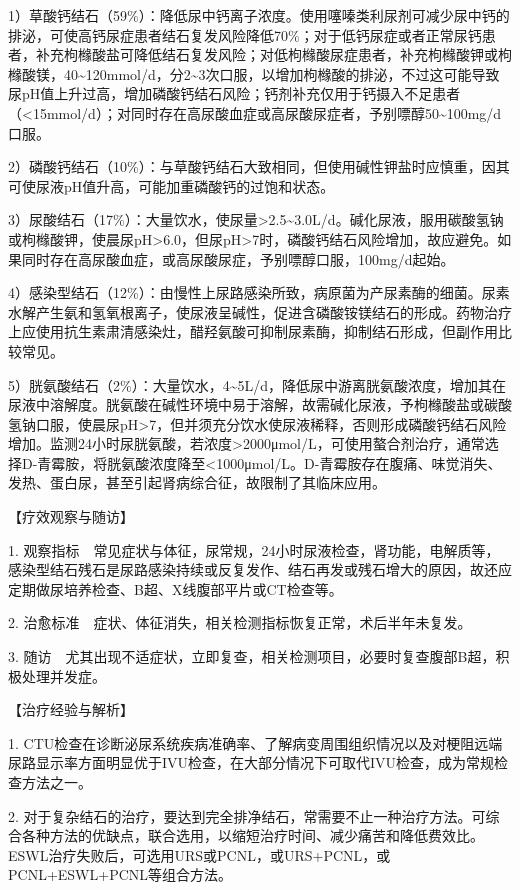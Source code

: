 1）草酸钙结石（59\%）：降低尿中钙离子浓度。使用噻嗪类利尿剂可减少尿中钙的排泌，可使高钙尿症患者结石复发风险降低70\%；对于低钙尿症或者正常尿钙患者，补充枸橼酸盐可降低结石复发风险；对低枸橼酸尿症患者，补充枸橼酸钾或枸橼酸镁，40\textasciitilde{}120mmol/d，分2\textasciitilde{}3次口服，以增加枸橼酸的排泌，不过这可能导致尿pH值上升过高，增加磷酸钙结石风险；钙剂补充仅用于钙摄入不足患者（\textless{}15mmol/d）；对同时存在高尿酸血症或高尿酸尿症者，予别嘌醇50\textasciitilde{}100mg/d口服。

2）磷酸钙结石（10\%）：与草酸钙结石大致相同，但使用碱性钾盐时应慎重，因其可使尿液pH值升高，可能加重磷酸钙的过饱和状态。

3）尿酸结石（17\%）：大量饮水，使尿量\textgreater{}2.5\textasciitilde{}3.0L/d。碱化尿液，服用碳酸氢钠或枸橼酸钾，使晨尿pH\textgreater{}6.0，但尿pH\textgreater{}7时，磷酸钙结石风险增加，故应避免。如果同时存在高尿酸血症，或高尿酸尿症，予别嘌醇口服，100mg/d起始。

4）感染型结石（12\%）：由慢性上尿路感染所致，病原菌为产尿素酶的细菌。尿素水解产生氨和氢氧根离子，使尿液呈碱性，促进含磷酸铵镁结石的形成。药物治疗上应使用抗生素肃清感染灶，醋羟氨酸可抑制尿素酶，抑制结石形成，但副作用比较常见。

5）胱氨酸结石（2\%）：大量饮水，4\textasciitilde{}5L/d，降低尿中游离胱氨酸浓度，增加其在尿液中溶解度。胱氨酸在碱性环境中易于溶解，故需碱化尿液，予枸橼酸盐或碳酸氢钠口服，使晨尿pH\textgreater{}7，但并须充分饮水使尿液稀释，否则形成磷酸钙结石风险增加。监测24小时尿胱氨酸，若浓度\textgreater{}2000μmol/L，可使用螯合剂治疗，通常选择D-青霉胺，将胱氨酸浓度降至\textless{}1000μmol/L。D-青霉胺存在腹痛、味觉消失、发热、蛋白尿，甚至引起肾病综合征，故限制了其临床应用。

【疗效观察与随访】

1.
观察指标　常见症状与体征，尿常规，24小时尿液检查，肾功能，电解质等，感染型结石残石是尿路感染持续或反复发作、结石再发或残石增大的原因，故还应定期做尿培养检查、B超、X线腹部平片或CT检查等。

2. 治愈标准　症状、体征消失，相关检测指标恢复正常，术后半年未复发。

3.
随访　尤其出现不适症状，立即复查，相关检测项目，必要时复查腹部B超，积极处理并发症。

【治疗经验与解析】

1.
CTU检查在诊断泌尿系统疾病准确率、了解病变周围组织情况以及对梗阻远端尿路显示率方面明显优于IVU检查，在大部分情况下可取代IVU检查，成为常规检查方法之一。

2.
对于复杂结石的治疗，要达到完全排净结石，常需要不止一种治疗方法。可综合各种方法的优缺点，联合选用，以缩短治疗时间、减少痛苦和降低费效比。ESWL治疗失败后，可选用URS或PCNL，或URS+PCNL，或PCNL+ESWL+PCNL等组合方法。

